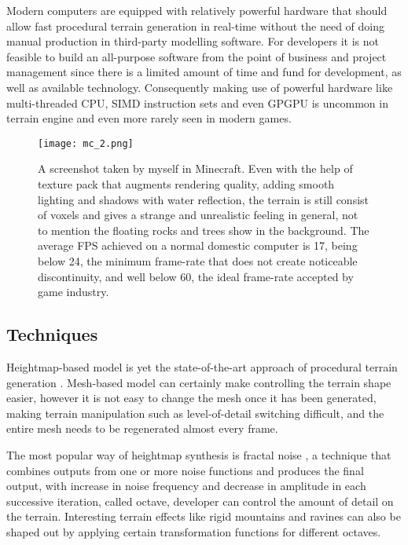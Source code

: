 \documentclass[oneside, a4paper]{article}
\begin{document}
    Modern computers are equipped with relatively powerful hardware that should allow fast procedural terrain generation in real-time without the need of doing manual production in third-party modelling software. For developers it is not feasible to build an all-purpose software from the point of business and project management since there is a limited amount of time and fund for development, as well as available technology. Consequently making use of powerful hardware like multi-threaded CPU, SIMD instruction sets and even GPGPU is uncommon in terrain engine and even more rarely seen in modern games.

    \begin{figure}[H]
        \texttt{[image: mc\_2.png]}
        \caption{A screenshot taken by myself in Minecraft. Even with the help of texture pack that augments rendering quality, adding smooth lighting and shadows with water reflection, the terrain is still consist of voxels and gives a strange and unrealistic feeling in general, not to mention the floating rocks and trees show in the background. The average FPS achieved on a normal domestic computer is 17, being below 24, the minimum frame-rate that does not create noticeable discontinuity, and well below 60, the ideal frame-rate accepted by game industry.}
    \end{figure}

    \subsection{Techniques}

    Heightmap-based model is yet the state-of-the-art approach of procedural terrain generation \cite{kang_sim_han_2018}. Mesh-based model can certainly make controlling the terrain shape easier, however it is not easy to change the mesh once it has been generated, making terrain manipulation such as level-of-detail switching difficult, and the entire mesh needs to be regenerated almost every frame.

    The most popular way of heightmap synthesis is fractal noise \cite{texturing_modeling}, a technique that combines outputs from one or more noise functions and produces the final output, with increase in noise frequency and decrease in amplitude in each successive iteration, called octave, developer can control the amount of detail on the terrain. Interesting terrain effects like rigid mountains and ravines can also be shaped out by applying certain transformation functions for different octaves.
    
\end{document}
